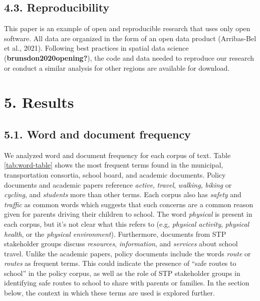 \documentclass[]{elsarticle} %
\begin{document}
\hypertarget{reproducibility}{%
\subsection{4.3. Reproducibility}\label{reproducibility}}

This paper is an example of open and reproducible research that uses
only open software. All data are organized in the form of an open data
product (Arribas-Bel et al., 2021). Following best practices in spatial
data science (\textbf{brunsdon2020opening?}), the code and data needed
to reproduce our research or conduct a similar analysis for other
regions are available for download.

\hypertarget{results}{%
\section{5. Results}\label{results}}

\hypertarget{word-and-document-frequency}{%
\subsection{5.1. Word and document
frequency}\label{word-and-document-frequency}}

We analyzed word and document frequency for each corpus of text. Table
\ref{tab:word-table} shows the most frequent terms found in the
municipal, transportation consortia, school board, and academic
documents. Policy documents and academic papers reference \emph{active},
\emph{travel}, \emph{walking}, \emph{biking} or \emph{cycling}, and
\emph{students} more than other terms. Each corpus also has
\emph{safety} and \emph{traffic} as common words which suggests that
such concerns are a common reason given for parents driving their
children to school. The word \emph{physical} is present in each corpus,
but it's not clear what this refers to (e.g, \emph{physical activity},
\emph{physical health}, or the \emph{physical environment}).
Furthermore, documents from STP stakeholder groups discuss
\emph{resources}, \emph{information}, and \emph{services} about school
travel. Unlike the academic papers, policy documents include the words
\emph{route} or \emph{routes} as frequent terms. This could indicate the
presence of ``safe routes to school'' in the policy corpus, as well as
the role of STP stakeholder groups in identifying safe routes to school
to share with parents or families. In the section below, the context in
which these terms are used is explored further.
\end{document}
